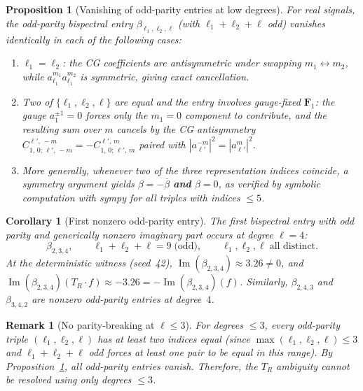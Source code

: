 \documentclass[11pt]{article}
\newtheorem{proposition}[theorem]{Proposition}
\newtheorem{corollary}[theorem]{Corollary}
\newtheorem{remark}[theorem]{Remark}
\DeclareMathOperator{\im}{Im}
\newcommand{\CG}[6]{C^{#5,\,#6}_{#1,\,#2;\,#3,\,#4}}
\newcommand{\conj}[1]{\overline{#1}}
\begin{document}
\begin{proposition}[Vanishing of odd-parity entries at low degrees]
\label{prop:odd-vanishing}
For real signals, the odd-parity bispectral entry
$\beta_{\ell_1,\ell_2,\ell}$ (with $\ell_1+\ell_2+\ell$ odd)
vanishes identically in each of the following cases:
\begin{enumerate}[nosep,label=(\roman*)]
\item $\ell_1 = \ell_2$: the CG coefficients are antisymmetric
  under swapping $m_1 \leftrightarrow m_2$, while
  $a_{\ell_1}^{m_1} a_{\ell_1}^{m_2}$ is symmetric, giving
  exact cancellation.
\item Two of $\{\ell_1, \ell_2, \ell\}$ are equal and the entry
  involves gauge-fixed $\mathbf{F}_1$: the gauge $a_1^{\pm 1} = 0$
  forces only the $m_1 = 0$ component to contribute, and the
  resulting sum over $m$ cancels by the CG antisymmetry
  $\CG{1}{0}{\ell'}{-m}{\ell'}{-m}
    = -\CG{1}{0}{\ell'}{m}{\ell'}{m}$
  paired with $|a_{\ell'}^{-m}|^2 = |a_{\ell'}^m|^2$.
\item More generally, whenever two of the three representation indices
  coincide, a symmetry argument yields $\beta = -\conj\beta$ \textbf{and}
  $\beta = 0$, as verified by symbolic computation with sympy for all
  triples with indices $\le 5$.
\end{enumerate}
\end{proposition}

\begin{corollary}[First nonzero odd-parity entry]\label{cor:first-odd}
The first bispectral entry with odd parity and generically nonzero imaginary
part occurs at degree $\ell = 4$:
\[
  \beta_{2,3,4}, \qquad
  \ell_1+\ell_2+\ell = 9 \;\text{(odd)},
  \qquad
  \ell_1, \ell_2, \ell \;\text{all distinct}.
\]
At the deterministic witness (seed~42), $\im(\beta_{2,3,4}) \approx 3.26 \ne 0$,
and $\im(\beta_{2,3,4})(T_R \cdot f) \approx -3.26 = -\im(\beta_{2,3,4})(f)$.
Similarly, $\beta_{2,4,3}$ and $\beta_{3,4,2}$ are nonzero odd-parity entries
at degree~$4$.
\end{corollary}

\begin{remark}[No parity-breaking at $\ell \le 3$]
For degrees $\le 3$, every odd-parity triple $(\ell_1,\ell_2,\ell)$
has at least two indices equal (since $\max(\ell_1,\ell_2,\ell) \le 3$
and $\ell_1+\ell_2+\ell$ odd forces at least one pair to be equal in this range).
By Proposition~\ref{prop:odd-vanishing}, all odd-parity entries vanish.
Therefore, the $T_R$ ambiguity cannot be resolved using only degrees $\le 3$.
\end{remark}
\end{document}
